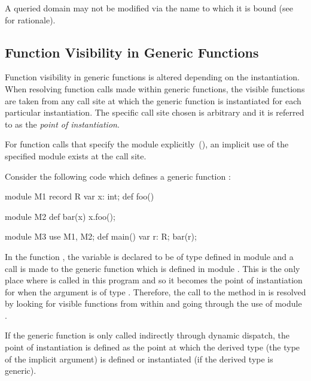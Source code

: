 A queried domain may not be modified via the name to which it is bound
(see~ for rationale).

\subsection{Function Visibility in Generic Functions}
\label{Function_Visibility_in_Generic_Functions}

Function visibility in generic functions is altered depending on the
instantiation.  When resolving function calls made within generic
functions, the visible functions are taken from any call site at which
the generic function is instantiated for each particular
instantiation.  The specific call site chosen is arbitrary and it is
referred to as the \emph{point of instantiation}.

For function calls that specify the module
explicitly~(), an implicit use of the specified
module exists at the call site.

\begin{example}
Consider the following code which defines a generic
function :
\begin{chapelpre}
\end{chapelpre}
\begin{chapel}
module M1 {
  record R {
    var x: int;
    def foo() { }
  }
}

module M2 {
  def bar(x) {
    x.foo();
  }
}

module M3 {
  use M1, M2;
  def main() {
    var r: R;
    bar(r);
  }
}
\end{chapel}
\begin{chapeloutput}
\end{chapeloutput}
In the function , the variable  is declared to be
of type  defined in module  and a call is made to the
generic function  which is defined in module .
This is the only place where  is called in this program and
so it becomes the point of instantiation for  when the
argument  is of type .  Therefore, the call to
the  method in  is resolved by looking for visible
functions from within  and going through the use of
module .
\end{example}

If the generic function is only called indirectly through dynamic
dispatch, the point of instantiation is defined as the point at which
the derived type (the type of the implicit  argument) is
defined or instantiated (if the derived type is generic).

